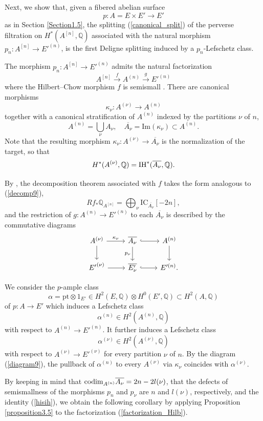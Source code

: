 \documentclass[11pt]{amsart}
\theoremstyle{plain}
\theoremstyle{definition}
\theoremstyle{remark}
\newcommand{\BQ}{{\mathbb{Q}}}
\begin{document}
{Next, we show that, given a fibered abelian surface 
\[p:A=E\times E' \to E'\]
  as in Section \ref{Section1.5}, 
the splitting (\ref{canonical_split}) of the perverse filtration on $H^*(A^{[n]}, \BQ)$ associated with the natural morphism  $p_n: A^{[n]} \to E'^{(n)}$, 
 is the first Deligne splitting induced by a  $p_n$-Lefschetz class. 

The morphism $p_n: A^{[n]} \to E'^{(n)}$ admits the natural factorization 
\begin{equation}\label{factorization_Hilb}
A^{[n]} \xrightarrow{f} A^{(n)} \xrightarrow{g} E'^{(n)}
\end{equation}
where the Hilbert--Chow morphism $f$ is semismall \cite{Go2}. There are canonical morphisms
\[
\kappa_\nu: A^{(\nu)} \to A^{(n)}
\]
together with a canonical stratification of $A^{(n)}$ indexed by the partitions $\nu$ of $n$,
\[
A^{(n)} = \bigcup_\nu A_\nu, \quad \overline{A_\nu} = \mathrm{Im}(\kappa_\nu) \subset A^{(n)}.
\]
Note that  the resulting morphism $\kappa_\nu:A^{(\nu)} \to \overline{A_\nu}$ is the normalization of the target,
so that 
\begin{equation}\label{hisih}
H^*(A^{(\nu)},\BQ)= {\rm IH}^*(\overline{A_\nu},\BQ).
\end{equation}

By \cite[Theorem 3]{Go2}, the decomposition theorem associated with $f$ takes the form
analogous to (\ref{decomp9}),
\[
Rf_* \BQ_{A^{[n]}} = \bigoplus_{\nu} \mathrm{IC}_{\overline{A_\nu}} [-2n],
\]
and the restriction of $g: A^{(n)} \to E'^{(n)}$ to each $\overline{A_\nu}$ is described by the commutative diagrams
\begin{equation}\label{diagram9}
\begin{tikzcd}
A^{(\nu)} \arrow{r}{\kappa_\nu}  \arrow[swap]{d} &  \overline{A_\nu}\arrow[r, hookrightarrow]  \arrow[swap]{d}{p_\nu} &  A^{(n)}  \arrow{d} \\
{E'}^{(\nu)} \arrow{r} & \overline{{E'_\nu}} \arrow[r, hookrightarrow] & E'^{(n)}.
\end{tikzcd}
\end{equation}

We consider the $p$-ample class
\[
\alpha = \mathrm{pt} \otimes 1_{E'} \in H^2(E, \BQ)\otimes H^0(E', \BQ) \subset H^2(A, \BQ)
\]
of $p:A \to E'$ which induces a Lefschetz class 
\begin{equation}\label{alpha(n)}
\alpha^{(n)} \in H^2(A^{(n)}, \BQ)
\end{equation}
with respect to $A^{(n)} \to E'^{(n)}$. It further induces a Lefschetz class
\[
\alpha^{(\nu)} \in H^2(A^{(\nu)}, \BQ)
\]
with respect to $A^{(\nu)} \to E'^{(\nu)}$ for every partition $\nu$ of $n$. By the diagram (\ref{diagram9}), the pullback of $\alpha^{(n)}$ to every $A^{(\nu)}$ via $\kappa_\nu$ coincides with $\alpha^{(\nu)}$.

By keeping in mind that  ${\rm codim}_{A^{(n)}} \overline{A_\nu}=2n -2l(\nu)$, that the defects of semismallness of the morphisms  $p_n$ and $p_\nu$ are $n$ and $l(\nu)$, respectively, and the identity (\ref{hisih}),
we obtain the following corollary by applying Proposition \ref{proposition3.5} to the factorization (\ref{factorization_Hilb}).
}
\end{document}
